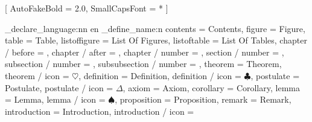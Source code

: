 \usepackage{amsmath, amssymb, array}
\newfontfamily{}[
  AutoFakeBold = 2.0,
  SmallCapsFont = *
]

\ExplSyntaxOn
\elegant_declare_language:nn { en }
  {
    \RequirePackage[UTF8]{ctex}
    \RequirePackage{bbding}
    \elegant_define_name:n 
      {
        contents = Contents,
        figure = Figure,
        table = Table,
        listoffigure = List Of Figures,
        listoftable = List Of Tables,
        chapter / before  = ,
          chapter / after = ,
          chapter / number = ,
        section / number = \thesection,
        subsection / number = \thesubsection,
        subsubsection / number = \thesubsubsection,
        theorem = Theorem,
          theorem / icon = $\heartsuit$,
        definition = Definition,
          definition / icon = $\clubsuit$,
        postulate = Postulate,
          postulate / icon = $\Delta$,
        axiom = Axiom,
        corollary = Corollary,
        lemma = Lemma,
          lemma / icon = $\spadesuit$,
        proposition = Proposition,
        remark = Remark,
        introduction = Introduction,
          introduction / icon = \SquareShadowBottomRight
      }
  }
\ExplSyntaxOff